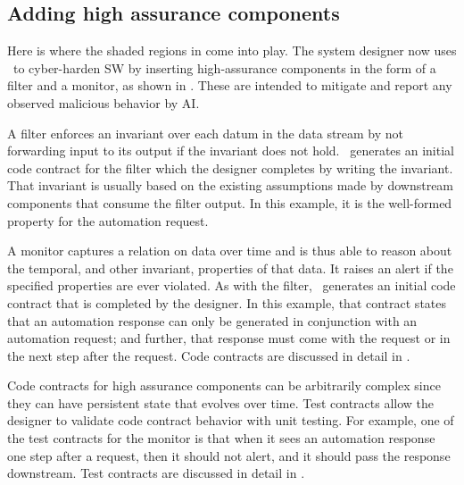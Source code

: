 \subsection{Adding high assurance components}

Here is where the shaded regions in  come into play.
The system designer now uses \brfcs\ to cyber-harden SW by inserting
high-assurance components in the form of a filter and a monitor, as
shown in .
These are intended to mitigate and report any observed malicious behavior by AI.

A filter enforces an invariant over
each datum in the data stream by not forwarding input to its output if the invariant does not hold.
\brfcs\ generates an initial code contract for the filter which the designer completes by writing the invariant.
That invariant is usually based on the existing assumptions made by
downstream components that consume the filter output.
In this example, it is the well-formed property for the automation request.

A monitor captures a relation on data over time and is thus able
to reason about the temporal, and other invariant, properties of that data.  It raises
an alert if the specified properties are ever violated.
As with the filter, \brfcs\ generates an initial code contract that is completed by the designer.
In this example, that contract states that an
automation response can only be generated in conjunction with an
automation request; and further, that response must come with the
request or in the next step after the request.
Code contracts are discussed in detail in .

Code contracts for high assurance components can be arbitrarily complex since they can have persistent state that evolves over time.
Test contracts allow the designer to validate code contract behavior with unit testing.
For example, one of the test contracts for the monitor is that when it sees an automation response one step after a request, then it should not alert, and it should pass the response downstream.
Test contracts are discussed in detail in .

